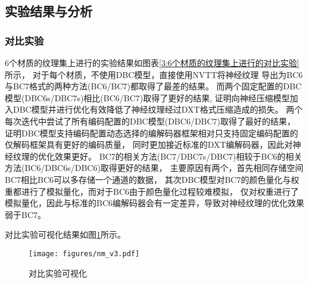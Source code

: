 \subsection{实验结果与分析}

\subsubsection{对比实验}
\label{3:对比实验}
6个材质的纹理集上进行的实验结果如图表\ref{3:6个材质的纹理集上进行的对比实验}所示，
对于每个材质，不使用DBC模型，直接使用NVTT将神经纹理
导出为BC6与BC7格式的两种方法(BC6/BC7)都取得了最差的结果。
而两个固定配置的DBC模型(DBC6s/DBC7s)相比(BC6/BC7)取得了更好的结果,
证明向神经压缩模型加入DBC模型并进行优化有效降低了神经纹理经过DXT格式压缩造成的损失。
两个每次迭代中尝试了所有编码配置的DBC模型(DBC6/DBC7)取得了最好的结果，
证明DBC模型支持编码配置动态选择的编解码器框架相对只支持固定编码配置的仅解码框架具有更好的编码质量，
同时更加接近标准的DXT编解码器，因此对神经纹理的优化效果更好。
BC7的相关方法(BC7/DBC7s/DBC7)相较于BC6的相关方法(BC6/DBC6s/DBC6)取得更好的结果，
主要原因有两个，首先相同存储空间BC7相比BC6可以多存储一个通道的数据，
其次DBC模型对BC7的颜色量化与权重都进行了模拟量化，而对于BC6由于颜色量化过程较难模拟，
仅对权重进行了模拟量化，因此与标准的BC6编解码器会有一定差异，导致对神经纹理的优化效果弱于BC7。

对比实验可视化结果如图\ref{fig:nm_v3}所示。
\begin{figure}[htbp]
    \centering
    \texttt{[image: figures/nm\_v3.pdf]}
    \caption{对比实验可视化}
    \label{fig:nm_v3}
\end{figure}


